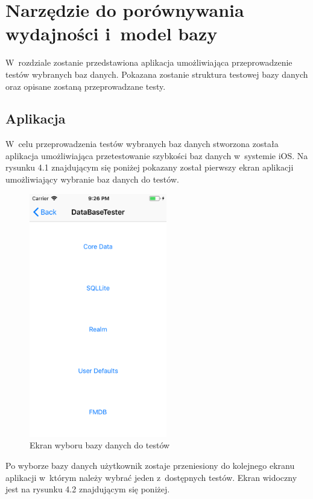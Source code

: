 \section{Narzędzie do porównywania wydajności i~model bazy }

 W~rozdziale zostanie przedstawiona aplikacja umożliwiająca przeprowadzenie testów wybranych baz danych. Pokazana zostanie struktura testowej bazy danych oraz opisane zostaną przeprowadzane testy.

\subsection{Aplikacja}

 W~celu przeprowadzenia testów wybranych baz danych stworzona została aplikacja umożliwiająca przetestowanie szybkości baz danych w~systemie iOS. Na rysunku 4.1 znajdującym się poniżej pokazany został pierwszy ekran aplikacji umożliwiający wybranie baz danych do testów. 

\begin{figure}[h]
\centering
	\includegraphics[width=6cm]{img/application/app-first-view.png}
	\caption{Ekran wyboru bazy danych do testów}
	\label{fig: first_app_view}
\end{figure}

Po wyborze bazy danych użytkownik zostaje przeniesiony do kolejnego ekranu aplikacji w~którym należy wybrać jeden z~dostępnych testów. Ekran widoczny jest na rysunku 4.2 znajdującym się poniżej.

